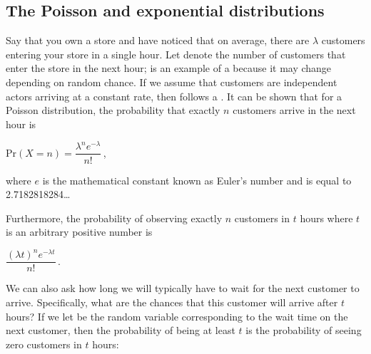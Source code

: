 \FloatBarrier
{}
\subsection{The Poisson and exponential distributions}

Say that you own a store and have noticed that on average, there are $\lambda$ customers entering your store in a single hour. Let  denote the number of customers that enter the store in the next hour;  is an example of a  because it may change depending on random chance. If we assume that customers are independent actors arriving at a constant rate, then  follows a . It can be shown that for a Poisson distribution, the probability that exactly $n$ customers arrive in the next hour is

\begin{center}
$\mathrm{Pr}(X = n) = \dfrac{\lambda^n e^{-\lambda}}{n!}$\,,
\end{center}

\noindent where $e$ is the mathematical constant known as Euler's number and is equal to 2.7182818284\ldots\\

\begin{note}\end{note}

Furthermore, the probability of observing exactly $n$ customers in $t$ hours where $t$ is an arbitrary positive number is

\begin{center}
$\dfrac{(\lambda t)^n e^{-\lambda t}}{n!}$\,.
\end{center}

We can also ask how long we will typically have to wait for the next customer to arrive. Specifically, what are the chances that this customer will arrive after $t$ hours? If we let  be the random variable corresponding to the wait time on the next customer, then the probability of  being at least $t$ is the probability of seeing zero customers in $t$ hours:

